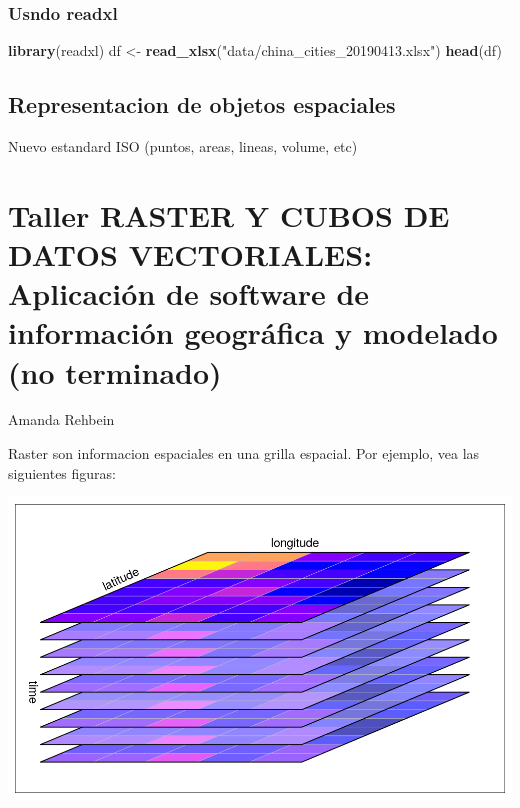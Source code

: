 \documentclass[]{book}
\newenvironment{Shaded}{\begin{snugshade}}{\end{snugshade}}
\newcommand{\KeywordTok}[1]{\textcolor[rgb]{0.13,0.29,0.53}{\textbf{#1}}}
\newcommand{\NormalTok}[1]{#1}
\newcommand{\StringTok}[1]{\textcolor[rgb]{0.31,0.60,0.02}{#1}}
\begin{document}
\hypertarget{usndo-readxl}{%
\subsection{Usndo readxl}\label{usndo-readxl}}

\begin{Shaded}
\begin{Highlighting}[]
\KeywordTok{library}\NormalTok{(readxl)}
\NormalTok{df <-}\StringTok{ }\KeywordTok{read_xlsx}\NormalTok{(}\StringTok{"data/china_cities_20190413.xlsx"}\NormalTok{)}
\KeywordTok{head}\NormalTok{(df)}
\end{Highlighting}
\end{Shaded}

\hypertarget{representacion-de-objetos-espaciales}{%
\section{Representacion de objetos espaciales}\label{representacion-de-objetos-espaciales}}

Nuevo estandard ISO (puntos, areas, lineas, volume, etc)

\hypertarget{taller-raster-y-cubos-de-datos-vectoriales-aplicacion-de-software-de-informacion-geografica-y-modelado-no-terminado}{%
\chapter{Taller RASTER Y CUBOS DE DATOS VECTORIALES: Aplicación de software de información geográfica y modelado (no terminado)}\label{taller-raster-y-cubos-de-datos-vectoriales-aplicacion-de-software-de-informacion-geografica-y-modelado-no-terminado}}

Amanda Rehbein

Raster son informacion espaciales en una grilla espacial. Por ejemplo, vea las siguientes figuras:

\includegraphics{figs/cube1.png}
\end{document}
